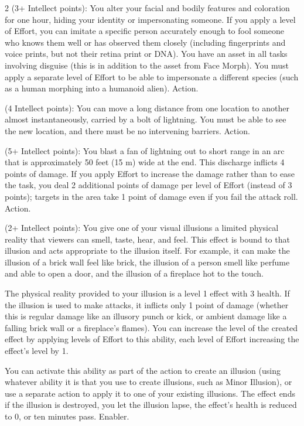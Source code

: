\begin{multicols}{2}
 (3+ Intellect points): You alter your facial and bodily features and coloration for one hour, hiding your identity or impersonating someone. If you apply a level of Effort, you can imitate a specific person accurately enough to fool someone who knows them well or has observed them closely (including fingerprints and voice prints, but not their retina print or DNA). You have an asset in all tasks involving disguise (this is in addition to the asset from Face Morph). You must apply a separate level of Effort to be able to impersonate a different species (such as a human morphing into a humanoid alien). Action.

 (4 Intellect points): You can move a long distance from one location to another almost instantaneously, carried by a bolt of lightning. You must be able to see the new location, and there must be no intervening barriers. Action. 

 (5+ Intellect points): You blast a fan of lightning out to short range in an arc that is approximately 50 feet (15 m) wide at the end. This discharge inflicts 4 points of damage. If you apply Effort to increase the damage rather than to ease the task, you deal 2 additional points of damage per level of Effort (instead of 3 points); targets in the area take 1 point of damage even if you fail the attack roll. Action. 

 (2+ Intellect points): You give one of your visual illusions a limited physical reality that viewers can smell, taste, hear, and feel. This effect is bound to that illusion and acts appropriate to the illusion itself. For example, it can make the illusion of a brick wall feel like brick, the illusion of a person smell like perfume and able to open a door, and the illusion of a fireplace hot to the touch.

The physical reality provided to your illusion is a level 1 effect with 3 health. If the illusion is used to make attacks, it inflicts only 1 point of damage (whether this is regular damage like an illusory punch or kick, or ambient damage like a falling brick wall or a fireplace’s flames). You can increase the level of the created effect by applying levels of Effort to this ability, each level of Effort increasing the effect’s level by 1.

You can activate this ability as part of the action to create an illusion (using whatever ability it is that you use to create illusions, such as Minor Illusion), or use a separate action to apply it to one of your existing illusions. The effect ends if the illusion is destroyed, you let the illusion lapse, the effect’s health is reduced to 0, or ten minutes pass. Enabler.


\end{multicols}
